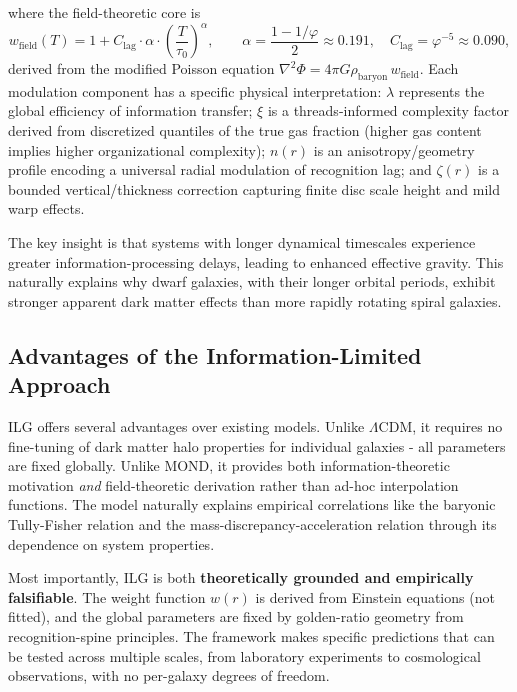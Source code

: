 \documentclass[usenatbib]{mnras}
\begin{document}
where the field-theoretic core is
\begin{equation}
w_\mathrm{field}(T) = 1 + C_\mathrm{lag}\cdot\alpha\cdot\left(\frac{T}{\tau_0}\right)^\alpha,
\qquad \alpha = \frac{1-1/\varphi}{2} \approx 0.191,\quad C_\mathrm{lag} = \varphi^{-5} \approx 0.090,
\end{equation}
derived from the modified Poisson equation $\nabla^2\Phi = 4\pi G\rho_\mathrm{baryon}\,w_\mathrm{field}$. Each modulation component has a specific physical interpretation: $\lambda$ represents the global efficiency of information transfer; $\xi$ is a threads-informed complexity factor derived from discretized quantiles of the true gas fraction (higher gas content implies higher organizational complexity); $n(r)$ is an anisotropy/geometry profile encoding a universal radial modulation of recognition lag; and $\zeta(r)$ is a bounded vertical/thickness correction capturing finite disc scale height and mild warp effects.

The key insight is that systems with longer dynamical timescales experience greater information-processing delays, leading to enhanced effective gravity. This naturally explains why dwarf galaxies, with their longer orbital periods, exhibit stronger apparent dark matter effects than more rapidly rotating spiral galaxies.

\subsection{Advantages of the Information-Limited Approach}

ILG offers several advantages over existing models. Unlike $\Lambda$CDM, it requires no fine-tuning of dark matter halo properties for individual galaxies - all parameters are fixed globally. Unlike MOND, it provides both information-theoretic motivation \emph{and} field-theoretic derivation rather than ad-hoc interpolation functions. The model naturally explains empirical correlations like the baryonic Tully-Fisher relation and the mass-discrepancy-acceleration relation through its dependence on system properties.

Most importantly, ILG is both \textbf{theoretically grounded and empirically falsifiable}. The weight function $w(r)$ is derived from Einstein equations (not fitted), and the global parameters are fixed by golden-ratio geometry from recognition-spine principles. The framework makes specific predictions that can be tested across multiple scales, from laboratory experiments to cosmological observations, with no per-galaxy degrees of freedom.
\end{document}
